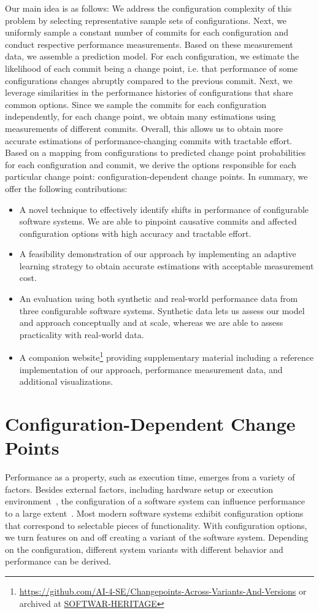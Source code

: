 \documentclass[sigconf]{acmart}
\begin{document}
	Our main idea is as follows: We address the configuration complexity of this problem by selecting representative sample sets of configurations.
	Next, we uniformly sample a constant number of commits for each configuration and conduct respective performance measurements.
	Based on these measurement data, we assemble a prediction model.
	For each configuration, we estimate the likelihood of each commit being a change point, i.e. that performance of some configurations changes abruptly compared to the previous commit.
	Next, we leverage similarities in the performance histories of configurations that share common options.
	Since we sample the commits for each configuration independently, for each change point, we obtain many estimations using measurements of different commits.
	Overall, this allows us to obtain more accurate estimations of performance-changing commits with tractable effort.
	Based on a mapping from configurations to predicted change point probabilities for each configuration and commit, we derive the options responsible for each particular change point: configuration-dependent change points.
	In summary, we offer the following contributions:
	\begin{itemize}
		\item A novel technique to effectively identify shifts in performance of configurable software systems. We are able to pinpoint causative commits and affected configuration options with high accuracy and tractable effort.
		\item A feasibility demonstration of our approach by implementing an adaptive learning strategy to obtain accurate estimations with acceptable measurement cost.
		\item An evaluation using both synthetic and real-world performance data from three configurable software systems. Synthetic data lets us assess our model and approach conceptually and at scale, whereas we are able to assess practicality with real-world data.
		\item A companion website\footnote{\url{https://github.com/AI-4-SE/Changepoints-Across-Variants-And-Versions} or archived at {\color{red}\url{SOFTWAR-HERITAGE}}} providing supplementary material including a reference implementation of our approach, performance measurement data, and additional visualizations.
	\end{itemize}
	
	\section{Configuration-Dependent Change Points}
	Performance as a property, such as execution time, emerges from a variety of factors.
	Besides external factors, including hardware setup or execution environment~\cite{ousterhout_always_2018}, the configuration  of a software system can influence performance to a large extent~\cite{siegmundPredictingPerformanceAutomated2012}.
	Most modern software systems exhibit configuration options that correspond to selectable pieces of functionality.
	With configuration options, we turn features on and off creating a variant of the software system.
	Depending on the configuration, different system variants with different behavior and performance can be derived.
	
\end{document}
